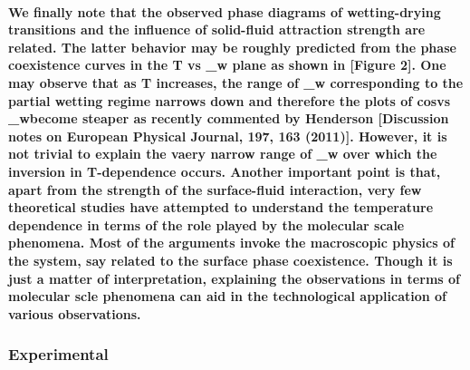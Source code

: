 \documentclass[a4paper,12pt,single,pdftex]{scrartcl}
\begin{document}
\label{ID_678529580}\paragraph{We finally note that the observed phase diagrams of wetting-drying transitions and the influence of solid-fluid attraction strength are related. The latter behavior may be roughly predicted from the phase coexistence curves in the T vs \epsilon_{w} plane as shown in [Figure 2]. One may observe that as T increases, the range of \epsilon_{w} corresponding to the partial wetting regime narrows down and therefore the plots of cos\theta vs \epsilon_{w}become steaper as recently commented by Henderson [Discussion notes on European Physical Journal, 197, 163 (2011)]. However, it is not trivial to explain the vaery narrow range of \epsilon_{w} over which the inversion in T-dependence occurs. Another important point is that, apart from the strength of the surface-fluid interaction, very few theoretical studies have attempted to understand the temperature dependence in terms of the role played by the molecular scale phenomena. Most of the arguments invoke the macroscopic physics of the system, say related to the surface phase coexistence. Though it is just a matter of interpretation, explaining the observations in terms of molecular scle phenomena can aid in the technological application of various observations.}

\label{ID_869146050}\subsubsection{Experimental}
\end{document}
